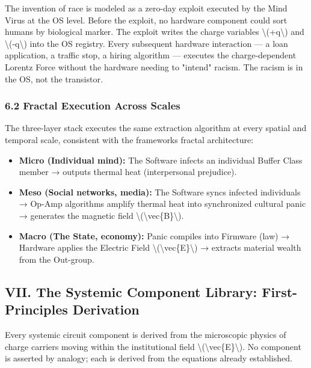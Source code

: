 {The invention of race is modeled as a zero-day exploit executed by the
Mind Virus at the OS level. Before the exploit, no hardware component
could sort humans by biological marker. The exploit writes the charge
variables \textbackslash(+q\textbackslash) and
\textbackslash(-q\textbackslash) into the OS registry. Every subsequent
hardware interaction --- a loan application, a traffic stop, a hiring
algorithm --- executes the charge-dependent Lorentz Force without the
hardware needing to "intend" racism. The racism is in the OS, not the
transistor.

\subsubsection{6.2 Fractal Execution Across
Scales}\label{fractal-execution-across-scales}

The three-layer stack executes the same extraction algorithm at every
spatial and temporal scale, consistent with the
framework\textquotesingle s fractal architecture:

\begin{itemize}
\tightlist
\item
  \textbf{Micro (Individual mind):} The Software infects an individual
  Buffer Class member → outputs thermal heat (interpersonal prejudice).
\item
  \textbf{Meso (Social networks, media):} The Software syncs infected
  individuals → Op-Amp algorithms amplify thermal heat into synchronized
  cultural panic → generates the magnetic field
  \textbackslash(\textbackslash vec\{B\}\textbackslash).
\item
  \textbf{Macro (The State, economy):} Panic compiles into Firmware
  (law) → Hardware applies the Electric Field
  \textbackslash(\textbackslash vec\{E\}\textbackslash) → extracts
  material wealth from the Out-group.
\end{itemize}

\protect{}\label{sec-component-library}
\subsection{VII. The Systemic Component Library: First-Principles
Derivation}\label{vii.-the-systemic-component-library-first-principles-derivation}

Every systemic circuit component is derived from the microscopic physics
of charge carriers moving within the institutional field
\textbackslash(\textbackslash vec\{E\}\textbackslash). No component is
asserted by analogy; each is derived from the equations already
established.

}
